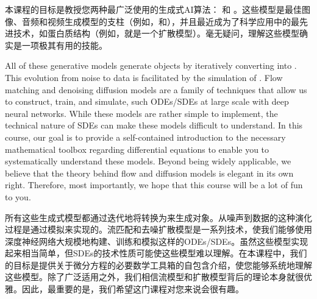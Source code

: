 本课程的目标是教授您两种最广泛使用的生成式AI算法： \citep{song2020score}和 \citep{lipman2022flow,liu2022flow, albergo2023stochastic, lipman2024flow}。这些模型是最佳图像、音频和视频生成模型的支柱（例如，和），并且最近成为了科学应用中的最先进技术，如蛋白质结构（例如，就是一个扩散模型）。毫无疑问，理解这些模型确实是一项极其有用的技能。

All of these generative models generate objects by iteratively converting   into . This evolution from noise to data is facilitated by the simulation of . Flow matching and denoising diffusion models are a family of techniques that allow us to construct, train, and simulate, such ODEs/SDEs at large scale with deep neural networks. While these models are rather simple to implement, the technical nature of SDEs can make these models difficult to understand. In this course, our goal is to provide a self-contained introduction to the necessary mathematical toolbox regarding differential equations to enable you to systematically understand these models. Beyond being widely applicable, we believe that the theory behind flow and diffusion models is elegant in its own right. Therefore, most importantly, we hope that this course will be a lot of fun to you. 

所有这些生成式模型都通过迭代地将转换为来生成对象。从噪声到数据的这种演化过程是通过模拟来实现的。流匹配和去噪扩散模型是一系列技术，使我们能够使用深度神经网络大规模地构建、训练和模拟这样的ODEs/SDEs。虽然这些模型实现起来相当简单，但SDEs的技术性质可能使这些模型难以理解。在本课程中，我们的目标是提供关于微分方程的必要数学工具箱的自包含介绍，使您能够系统地理解这些模型。除了广泛适用之外，我们相信流模型和扩散模型背后的理论本身就很优雅。因此，最重要的是，我们希望这门课程对您来说会很有趣。 

